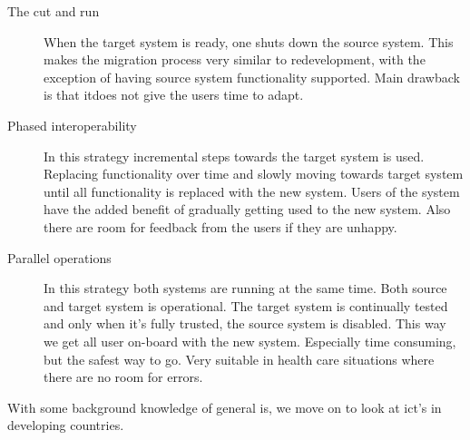 \begin{description}
\item[The cut and run] When the target system is ready, one shuts down the source system.
This makes the migration process very similar to redevelopment, with the exception of having source system functionality supported. Main drawback is that itdoes not give the users time to adapt.

\item[Phased interoperability] In this strategy incremental steps towards the target system is used. Replacing functionality over time and slowly moving towards target system until all functionality is replaced with the new system. Users of the system have the added benefit of gradually getting used to the new system. Also there are room for feedback from the users if they are unhappy.

\item[Parallel operations] In this strategy both systems are running at the same time. Both source and target system is operational. 
The target system is continually tested and only when it's fully trusted, the source system is disabled. This way we get all user on-board with the new system. Especially time consuming, but the safest way to go. Very suitable in health care situations where there are no room for errors.\\
\cite{leg:jdbj}
\end{description}
With some background knowledge of general \gls{is}, we move on to look at \gls{ict}'s in developing countries.
